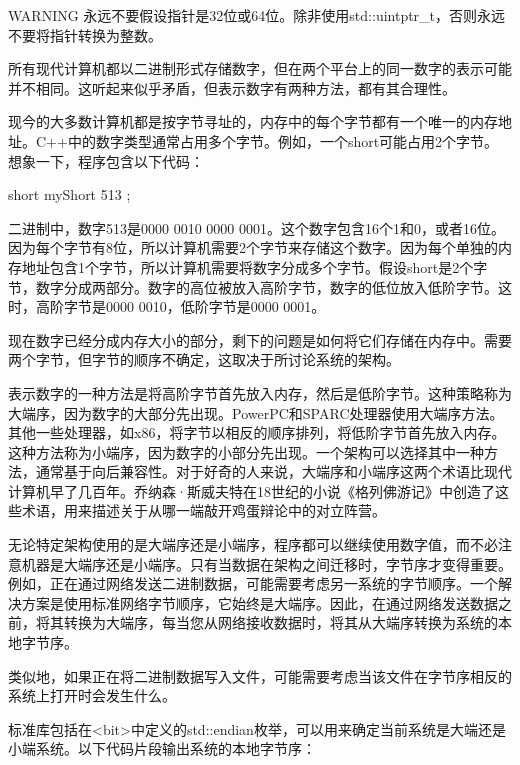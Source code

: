 \begin{myWarning}{WARNING}
永远不要假设指针是32位或64位。除非使用std::uintptr\_t，否则永远不要将指针转换为整数。
\end{myWarning}


所有现代计算机都以二进制形式存储数字，但在两个平台上的同一数字的表示可能并不相同。这听起来似乎矛盾，但表示数字有两种方法，都有其合理性。

现今的大多数计算机都是按字节寻址的，内存中的每个字节都有一个唯一的内存地址。C++中的数字类型通常占用多个字节。例如，一个short可能占用2个字节。想象一下，程序包含以下代码：

\begin{cpp}
short myShort { 513 };
\end{cpp}

二进制中，数字513是0000 0010 0000 0001。这个数字包含16个1和0，或者16位。因为每个字节有8位，所以计算机需要2个字节来存储这个数字。因为每个单独的内存地址包含1个字节，所以计算机需要将数字分成多个字节。假设short是2个字节，数字分成两部分。数字的高位被放入高阶字节，数字的低位放入低阶字节。这时，高阶字节是0000 0010，低阶字节是0000 0001。

现在数字已经分成内存大小的部分，剩下的问题是如何将它们存储在内存中。需要两个字节，但字节的顺序不确定，这取决于所讨论系统的架构。

表示数字的一种方法是将高阶字节首先放入内存，然后是低阶字节。这种策略称为大端序，因为数字的大部分先出现。PowerPC和SPARC处理器使用大端序方法。其他一些处理器，如x86，将字节以相反的顺序排列，将低阶字节首先放入内存。这种方法称为小端序，因为数字的小部分先出现。一个架构可以选择其中一种方法，通常基于向后兼容性。对于好奇的人来说，大端序和小端序这两个术语比现代计算机早了几百年。乔纳森·斯威夫特在18世纪的小说《格列佛游记》中创造了这些术语，用来描述关于从哪一端敲开鸡蛋辩论中的对立阵营。

无论特定架构使用的是大端序还是小端序，程序都可以继续使用数字值，而不必注意机器是大端序还是小端序。只有当数据在架构之间迁移时，字节序才变得重要。例如，正在通过网络发送二进制数据，可能需要考虑另一系统的字节顺序。一个解决方案是使用标准网络字节顺序，它始终是大端序。因此，在通过网络发送数据之前，将其转换为大端序，每当您从网络接收数据时，将其从大端序转换为系统的本地字节序。

类似地，如果正在将二进制数据写入文件，可能需要考虑当该文件在字节序相反的系统上打开时会发生什么。

标准库包括在<bit>中定义的std::endian枚举，可以用来确定当前系统是大端还是小端系统。以下代码片段输出系统的本地字节序：

